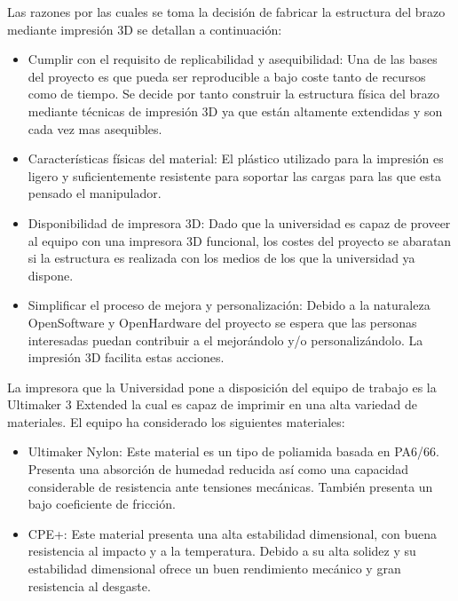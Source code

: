Las razones por las cuales se toma la decisión de fabricar la estructura del brazo mediante impresión 3D se detallan a continuación:

\begin{itemize}
  \item Cumplir con el requisito de replicabilidad y asequibilidad: Una de las bases del proyecto es que pueda ser reproducible a bajo coste tanto de recursos como de tiempo. Se decide por tanto construir la estructura física del brazo mediante técnicas de impresión 3D ya que están altamente extendidas y son cada vez mas asequibles.
  
  \item Características físicas del material: El plástico utilizado para la impresión es ligero y suficientemente resistente para soportar las cargas para las que esta pensado el manipulador.
  
  \item Disponibilidad de impresora 3D: Dado que la universidad es capaz de proveer al equipo con una impresora 3D funcional, los costes del proyecto se abaratan si la estructura es realizada con los medios de los que la universidad ya dispone.
  
  \item Simplificar el proceso de mejora y personalización: Debido a la naturaleza OpenSoftware y OpenHardware del proyecto se espera que las personas interesadas puedan contribuir a el mejorándolo y/o personalizándolo. La impresión 3D facilita estas acciones.
\end{itemize}

La impresora que la Universidad pone a disposición del equipo de trabajo es la Ultimaker 3 Extended la cual es capaz de imprimir en una alta variedad de materiales. El equipo ha considerado los siguientes materiales:

\begin{itemize}
    \item Ultimaker Nylon: Este material es un tipo de poliamida basada en PA6/66. Presenta una absorción de humedad reducida así como una capacidad considerable de resistencia ante tensiones mecánicas. También presenta un bajo coeficiente de fricción.
    \item CPE+: Este material presenta una alta estabilidad dimensional, con buena resistencia al impacto y a la temperatura. Debido a su alta solidez y su estabilidad dimensional ofrece un buen rendimiento mecánico y gran resistencia al desgaste.
\end{itemize}

